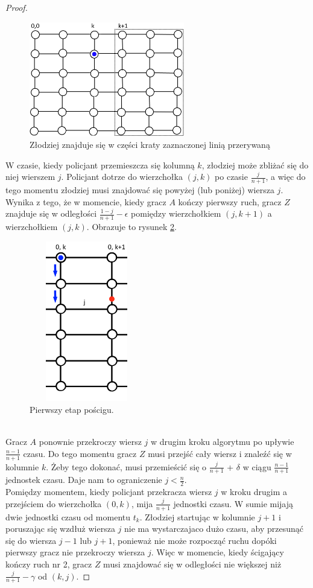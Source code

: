 \documentclass[brudnopis]{xmgr}
\theoremstyle{definition}
\begin{document}
\begin{proof}
	\begin{figure}[ht!]
	  \centering
	  \includegraphics[height=5cm]{rysunki/podsiatka.png}
	  \caption{Złodziej znajduje się w części kraty zaznaczonej linią przerywaną}
    \label{fig:miejsceucieczki}
	\end{figure} 

	\indent W czasie, kiedy policjant przemieszcza się kolumną $k$, złodziej może zbliżać się do niej wierszem $j$. Policjant dotrze do wierzchołka $(j,k)$ po czasie $\frac{j}{n+1}$, a więc do tego momentu złodziej musi znajdować się powyżej (lub poniżej) wiersza $j$. Wynika z tego, że w momencie, kiedy gracz $A$ kończy pierwszy ruch, gracz $Z$ znajduje się w odległości $\frac{1-j}{n+1} - \epsilon$ pomiędzy wierzchołkiem $(j,k + 1)$ a wierzchołkiem $(j,k)$. Obrazuje to rysunek \ref{fig:pierwszy krok}.
	\begin{figure}[ht!]
	  \centering
	  \includegraphics[width=5cm,height=7cm]{rysunki/poscig_1.png}
	  \caption{Pierwszy etap pościgu.}
	  \label{fig:pierwszy krok}
	\end{figure}
	\\\indent Gracz $A$ ponownie przekroczy wiersz $j$ w drugim kroku algorytmu po upływie $\frac{n-1}{n+1}$ czasu. Do tego momentu gracz $Z$ musi przejść cały wiersz i znaleźć się w kolumnie $k$. Żeby tego dokonać, musi przemieścić się o $\frac{j}{n+1}$ + $\delta$ w ciągu $\frac{n-1}{n+1}$ jednostek czasu. Daje nam to ograniczenie $j < \frac{n}{2}$.
	\\\indent Pomiędzy momentem, kiedy policjant przekracza wiersz $j$ w kroku drugim a przejściem do wierzchołka $(0,k)$, mija $\frac{j}{n+1}$ jednostki czasu. W sumie mijają dwie jednostki czasu od momentu $t_k$. Złodziej startując w kolumnie $j + 1$ i poruszając się wzdłuż wiersza $j$ nie ma wystarczajaco dużo czasu, aby przesunąć się do wiersza $j - 1$ lub $j + 1$, ponieważ nie może rozpocząć ruchu dopóki pierwszy gracz nie przekroczy wiersza $j$. Więc w momencie, kiedy ścigający kończy ruch nr 2, gracz $Z$ musi znajdować się w odległości nie większej niż $\frac{j}{n+1} - \gamma$ od $(k,j)$. 


\end{proof}
\end{document}
